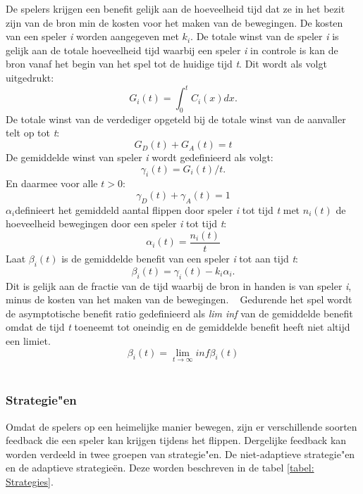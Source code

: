 \documentclass[master=cws, masteroption=vs,english]{kulemt}
\begin{document}
\begin{abstract*}
De spelers krijgen een benefit gelijk aan de hoeveelheid tijd dat ze in het bezit zijn van de bron min de kosten voor het maken van de bewegingen. De kosten van een speler \textit{i} worden aangegeven met $ k_{i} $.
De totale winst van de speler \textit{i} is gelijk aan de totale hoeveelheid tijd waarbij een speler \textit{i} in controle is kan de bron vanaf het begin van het spel tot de huidige tijd \textit{t}. Dit wordt als volgt uitgedrukt:
\begin{equation}
G_{i}(t) = \int_0^t \! C_{i}(x) dx.
\end{equation}
De totale winst van de verdediger opgeteld bij de totale winst van de aanvaller telt op tot \textit{t}:
\begin{equation} 
G_{D}(t) + G_{A}(t) = t
\end{equation}
De gemiddelde winst van speler \textit{i} wordt gedefinieerd als volgt:
\begin{equation}
\gamma_{i}(t) = G_{i}(t) / t.
\end{equation}
En daarmee voor alle $ t> 0 $:
\begin{equation} 
\gamma_{D}(t) + \gamma_{A}(t) = 1
\end{equation}
$\alpha_{i}$definieert het gemiddeld aantal flippen door speler \textit{i} tot tijd \textit{t} met $n_{i}(t)$ de hoeveelheid bewegingen door een speler \textit{i} tot tijd \textit{t}:
\begin{equation}
\alpha_{i}(t) = \dfrac{n_{i}(t)}{t}
\end{equation}
Laat $ \beta_{i}(t) $ is de gemiddelde benefit van een speler \textit{i} tot aan tijd \textit{t}:
\begin{equation}
\beta_{i}(t) = \gamma_{i}(t) - k_{i} \alpha_{i}.
\end{equation}
Dit is gelijk aan de fractie van de tijd waarbij de bron in handen is van speler \textit{i}, minus de kosten van het maken van de bewegingen. ~ 
Gedurende het spel wordt de asymptotische benefit ratio gedefinieerd als \textit{lim inf} van de gemiddelde benefit omdat de tijd \textit{t} toeneemt tot oneindig en de gemiddelde benefit heeft niet altijd een limiet.
\begin{equation}
\beta_{i} (t) = \lim_{t \to \infty } inf \beta_{i}(t)
\end{equation}
\\


\subsubsection{Strategie"en}
Omdat de spelers op een heimelijke manier bewegen, zijn er verschillende soorten feedback die een speler kan krijgen tijdens het flippen. Dergelijke feedback kan worden verdeeld in twee groepen van strategie"en. De niet-adaptieve strategie"en en de adaptieve strategie\"en. Deze worden beschreven in de tabel \ref{tabel: Strategies}. \\


\end{abstract*}
\end{document}
